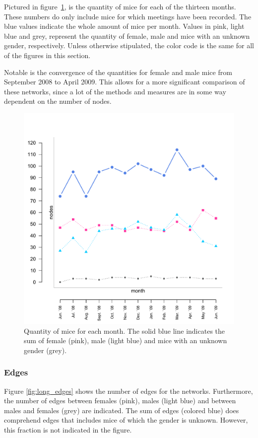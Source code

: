 Pictured in figure~\ref{fig:long_node}, is the quantity of mice for each of the thirteen months. These numbers do only include mice for which meetings have been recorded. The blue values indicate the whole amount of mice per month. Values in pink, light blue and grey, represent the quantity of female, male and mice with an unknown gender, respectively. Unless otherwise stipulated, the color code is the same for all of the figures in this section.

Notable is the convergence of the quantities for female and male mice from September 2008 to April 2009. This allows for a more significant comparison of these networks, since a lot of the methods and measures are in some way dependent on the number of nodes.  

\begin{figure}[htpb]
\begin{center}
  \includegraphics[width=.6\textwidth]{assets/pdf/long_nodes.pdf}
  \caption[Number of mice over the months]{Quantity of mice for each month. The solid blue line indicates the sum of female (pink), male (light blue) and mice with an unknown gender (grey).}
  \label{fig:long_node}
\end{center}
\end{figure}

\clearpage

\subsubsection{Edges}

Figure \ref{fig:long_edges} shows the number of edges for the networks. Furthermore, the number of edges between females (pink), males (light blue) and between males and females (grey) are indicated. The sum of edges (colored blue) does comprehend edges that includes mice of which the gender is unknown. However, this fraction is not indicated in the figure.

